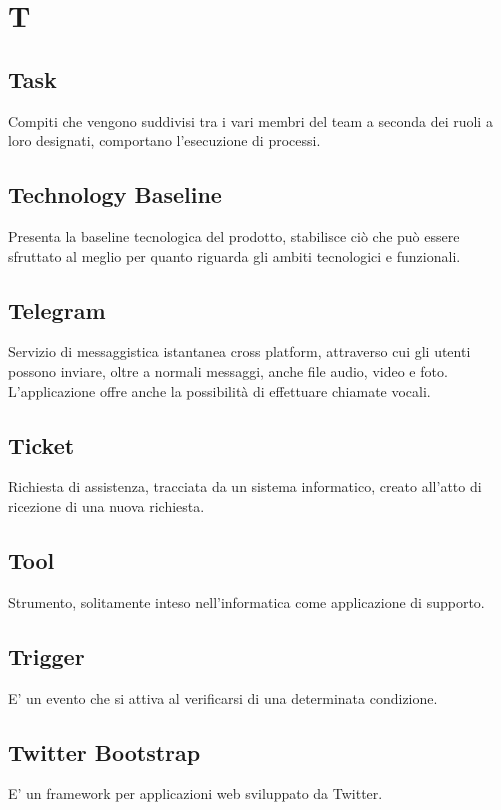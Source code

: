 \section*{T}

\subsection{Task}
Compiti che vengono suddivisi tra i vari membri del team a seconda dei ruoli a loro designati, comportano l'esecuzione di processi.

\subsection{Technology Baseline}
Presenta la baseline tecnologica del prodotto, stabilisce ciò che può essere sfruttato al meglio per quanto riguarda gli ambiti tecnologici  e funzionali.

\subsection{Telegram}
Servizio di messaggistica istantanea cross platform, attraverso cui gli utenti possono inviare, oltre a normali messaggi, anche file audio, video e foto. L'applicazione offre anche la possibilità di effettuare chiamate vocali.

\subsection{Ticket}
Richiesta di assistenza, tracciata da un sistema informatico, creato all'atto di ricezione di una nuova richiesta.

\subsection{Tool}
Strumento, solitamente inteso nell'informatica come applicazione di supporto.

\subsection{Trigger}
E' un evento che si attiva al verificarsi di una determinata condizione.

\subsection{Twitter Bootstrap}
E' un framework per applicazioni web sviluppato da Twitter.


